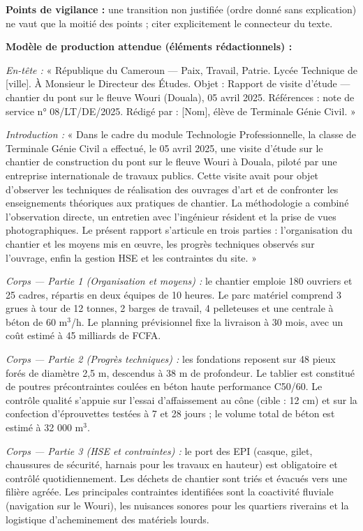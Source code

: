 \documentclass[11pt]{article}
\begin{document}
\begin{corrige}
\textbf{Points de vigilance :} une transition non justifiée (ordre donné sans explication) ne vaut que la moitié des points ; citer explicitement le connecteur du texte.
\end{corrige}

\begin{corrige}
\textbf{Modèle de production attendue (éléments rédactionnels) :}

\emph{En-tête :} « République du Cameroun — Paix, Travail, Patrie. Lycée Technique de [ville]. À Monsieur le Directeur des Études. Objet : Rapport de visite d'étude — chantier du pont sur le fleuve Wouri (Douala), 05 avril 2025. Références : note de service n° 08/LT/DE/2025. Rédigé par : [Nom], élève de Terminale Génie Civil. »

\emph{Introduction :} « Dans le cadre du module Technologie Professionnelle, la classe de Terminale Génie Civil a effectué, le 05 avril 2025, une visite d'étude sur le chantier de construction du pont sur le fleuve Wouri à Douala, piloté par une entreprise internationale de travaux publics. Cette visite avait pour objet d'observer les techniques de réalisation des ouvrages d'art et de confronter les enseignements théoriques aux pratiques de chantier. La méthodologie a combiné l'observation directe, un entretien avec l'ingénieur résident et la prise de vues photographiques. Le présent rapport s'articule en trois parties : l'organisation du chantier et les moyens mis en œuvre, les progrès techniques observés sur l'ouvrage, enfin la gestion HSE et les contraintes du site. »

\emph{Corps — Partie 1 (Organisation et moyens) :} le chantier emploie 180 ouvriers et 25 cadres, répartis en deux équipes de 10 heures. Le parc matériel comprend 3 grues à tour de 12 tonnes, 2 barges de travail, 4 pelleteuses et une centrale à béton de 60 m$^3$/h. Le planning prévisionnel fixe la livraison à 30 mois, avec un coût estimé à 45 milliards de FCFA.

\emph{Corps — Partie 2 (Progrès techniques) :} les fondations reposent sur 48 pieux forés de diamètre 2,5 m, descendus à 38 m de profondeur. Le tablier est constitué de poutres précontraintes coulées en béton haute performance C50/60. Le contrôle qualité s'appuie sur l'essai d'affaissement au cône (cible : 12 cm) et sur la confection d'éprouvettes testées à 7 et 28 jours ; le volume total de béton est estimé à 32 000 m$^3$.

\emph{Corps — Partie 3 (HSE et contraintes) :} le port des EPI (casque, gilet, chaussures de sécurité, harnais pour les travaux en hauteur) est obligatoire et contrôlé quotidiennement. Les déchets de chantier sont triés et évacués vers une filière agréée. Les principales contraintes identifiées sont la coactivité fluviale (navigation sur le Wouri), les nuisances sonores pour les quartiers riverains et la logistique d'acheminement des matériels lourds.


\end{corrige}
\end{document}
